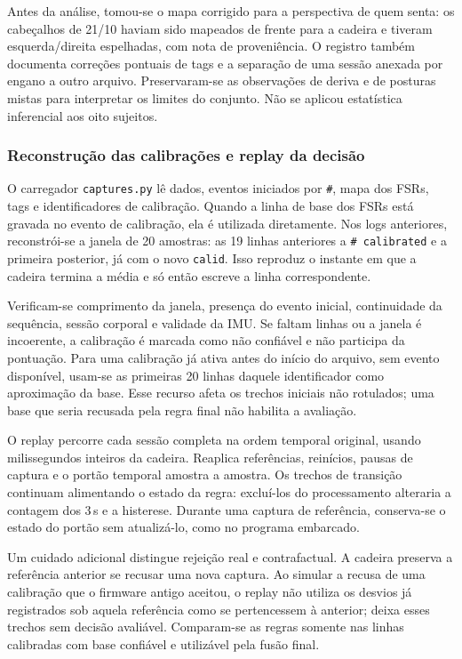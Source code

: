 Antes da análise, tomou-se o mapa corrigido para a perspectiva de
quem senta: os cabeçalhos de 21/10 haviam sido mapeados de frente
para a cadeira e tiveram esquerda/direita espelhadas, com nota de
proveniência. O registro também documenta correções pontuais de tags
e a separação de uma sessão anexada por engano a outro arquivo.
Preservaram-se as observações de deriva e de posturas mistas para
interpretar os limites do conjunto. Não se aplicou estatística
inferencial aos oito sujeitos.

\subsubsection{Reconstrução das calibrações e replay da decisão}

O carregador \texttt{captures.py} lê dados, eventos iniciados por
\texttt{\#}, mapa dos FSRs, tags e identificadores de calibração.
Quando a linha de base dos FSRs está gravada no evento de calibração,
ela é utilizada diretamente. Nos logs anteriores, reconstrói-se a
janela de 20 amostras: as 19 linhas anteriores a
\texttt{\# calibrated} e a primeira posterior, já com o novo
\texttt{calid}. Isso reproduz o instante em que a cadeira termina
a média e só então escreve a linha correspondente.

Verificam-se comprimento da janela, presença do evento inicial,
continuidade da sequência, sessão corporal e validade da IMU. Se
faltam linhas ou a janela é incoerente, a calibração é marcada como
não confiável e não participa da pontuação. Para uma calibração já
ativa antes do início do arquivo, sem evento disponível, usam-se as
primeiras 20 linhas daquele identificador como aproximação da base.
Esse recurso afeta os trechos iniciais não rotulados; uma base que
seria recusada pela regra final não habilita a avaliação.

O replay percorre cada sessão completa na ordem temporal original,
usando milissegundos inteiros da cadeira. Reaplica referências,
reinícios, pausas de captura e o portão temporal amostra a amostra.
Os trechos de transição continuam alimentando o estado da regra:
excluí-los do processamento alteraria a contagem dos 3\,s e a
histerese. Durante uma captura de referência, conserva-se o estado
do portão sem atualizá-lo, como no programa embarcado.

Um cuidado adicional distingue rejeição real e contrafactual. A
cadeira preserva a referência anterior se recusar uma nova captura.
Ao simular a recusa de uma calibração que o firmware antigo aceitou,
o replay não utiliza os desvios já registrados sob aquela referência
como se pertencessem à anterior; deixa esses trechos sem decisão
avaliável. Comparam-se as regras somente nas linhas calibradas com
base confiável e utilizável pela fusão final.

